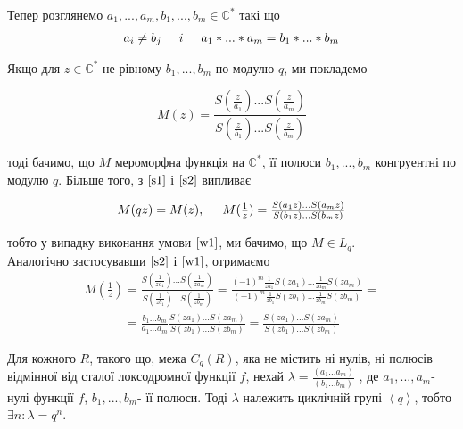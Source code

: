 \documentclass[12pt,a4paper]{article}
\begin{document}
Тепер розглянемо $a_{1},...,a_{m},b_{1},...,b_{m}\in \mathbb{C}^{*}$ такі що\\
\begin{equation}\label{w1}
\begin{array}{l} 
 a_{i}\neq b_{j} \hspace{0,5cm}  i  \hspace{0,5cm} a_{1}*...*a_{m}=b_{1}*...*b_{m}
\end{array}
\end{equation} 

Якщо для $z \in \mathbb{C}^{*}$ не рівному $b_{1},...,b_{m}$ по модулю $q $, ми покладемо
\begin{center}
\[ M(z)=\frac{S(\frac{z}{a_{1}})...S(\frac{z}{a_{m}})}{S(\frac{z}{b_{1}})...S(\frac{z}{b_{m}})}\]\label{M(z)}
\end{center}
тоді бачимо, що $M$ мероморфна функція на $\mathbb{C}^{*}$, її полюси $b_{1},...,b_{m}$ конгруентні по модулю $q$. Більше того, з $\eqref{s1}$ і $\eqref{s2}$ випливає

\begin{equation}\label{q2}
\begin{array}{l} 
 M(qz)=M(z), \hspace{0,5cm} M(\frac{1}{z})=\frac{S(a_{1}z)...S(a_{m}z)}{S(b_{1}z)...S(b_{m}z)}     
\end{array}
\end{equation}  
 
тобто у випадку виконання умови  $\eqref{w1}$, ми бачимо, що $M\in L_{q}$.\\


Аналогічно застосувавши $\eqref{s2}$ і $\eqref{w1}$, отримаємо\\
\[\begin{array}{l}
M(\frac{1}{z})=\frac{S(\frac{1}{za_{1}})...S(\frac{1}{za_{m}})}{S(\frac{1}{zb_{1}})...S(\frac{1}{zb_{m}})}= 
\frac{(-1)^m \frac{1}{za_{1}} S(za_{1})...\frac{1}{za_{m}} S(za_{m})}{(-1)^m \frac{1}{zb_{1}} S(zb_{1})...\frac{1}{zb_{m}} S(zb_{m})}=
\end{array}\]
\[\begin{array}{l}
= \frac{b_{1}...b_{m}}{a_{1}...a_{m}}
\frac{ S(za_{1})...S(za_{m})}{S(zb_{1})...S(zb_{m})}=\frac{ S(za_{1})...S(za_{m})}{S(zb_{1})...S(zb_{m})}  
\end{array} \]
\vspace{1,5cm}

\begin{thm}
Для кожного $R$, такого що, межа $C_{q}(R)$, яка не містить ні нулів, ні полюсів відмінної від сталої локсодромної функції $f$, нехай $\lambda=\frac{(a_{1}...a_{m})}{(b_{1}...b_{m})}$ , де $a_{1},...,a_{m}$- нулі функції $f$, $b_{1},...,b_{m}$- її полюси. Тоді $\lambda$ належить циклічній групі $\left \langle q \right \rangle$, тобто $ \exists n:\lambda =q^{n}$.
\end{thm}
\end{document}
